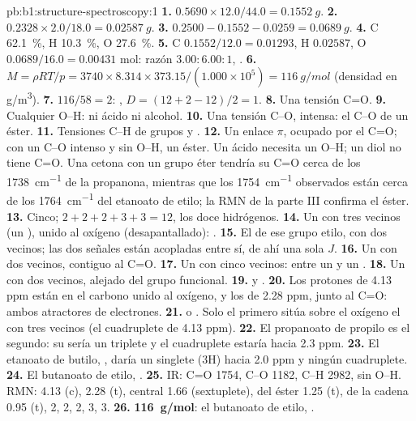 \begin{solution}{pb:b1:structure-spectroscopy:1}
\textbf{1.} $0.5690 \times 12.0/44.0 = \qty{0.1552}{g}$.
\textbf{2.} $0.2328 \times 2.0/18.0 = \qty{0.02587}{g}$.
\textbf{3.} $0.2500 - 0.1552 - 0.0259 = \qty{0.0689}{g}$.
\textbf{4.} C \qty{62.1}{\percent}, H \qty{10.3}{\percent}, O
\qty{27.6}{\percent}.
\textbf{5.} C $0.1552/12.0 = 0.01293$, H $0.02587$, O $0.0689/16.0 =
0.00431$ mol: razón $3.00 : 6.00 : 1$, .
\textbf{6.} $M = \rho RT/p = 3740 \times 8.314 \times 373.15/(1.000 \times 10^5) =
\qty{116}{g/mol}$ (densidad en \unit{g/m^3}).
\textbf{7.} $116/58 = 2$: , $D = (12 + 2 - 12)/2 = 1$.
\textbf{8.} Una tensión C=O.
\textbf{9.} Cualquier O--H: ni ácido ni alcohol.
\textbf{10.} Una tensión C--O, intensa: el C--O de un éster.
\textbf{11.} Tensiones C--H de grupos  y .
\textbf{12.} Un enlace $\pi$, ocupado por el C=O; con un C--O intenso y
sin O--H, un éster. Un ácido necesita un O--H; un diol no tiene C=O. Una
cetona con un grupo éter tendría su C=O cerca de los \qty{1738}{cm^{-1}}
de la propanona, mientras que los \qty{1754}{cm^{-1}} observados están
cerca de los \qty{1764}{cm^{-1}} del etanoato de etilo; la RMN de la parte
III confirma el éster.
\textbf{13.} Cinco; $2 + 2 + 2 + 3 + 3 = 12$, los doce hidrógenos.
\textbf{14.} Un  con tres vecinos (un ), unido al oxígeno
(desapantallado): .
\textbf{15.} El  de ese grupo etilo, con dos vecinos; las dos
señales están acopladas entre sí, de ahí una sola $J$.
\textbf{16.} Un  con dos vecinos, contiguo al C=O.
\textbf{17.} Un  con cinco vecinos: entre un  y un
.
\textbf{18.} Un  con dos vecinos, alejado del grupo funcional.
\textbf{19.}  y .
\textbf{20.} Los protones de 4.13 ppm están en el carbono unido al
oxígeno, y los de 2.28 ppm, junto al C=O: ambos atractores de electrones.
\textbf{21.}  o . Solo
el primero sitúa sobre el oxígeno el  con tres vecinos (el
cuadruplete de 4.13 ppm).
\textbf{22.} El propanoato de propilo es el segundo: su  sería un
triplete y el cuadruplete estaría hacia 2.3 ppm.
\textbf{23.} El etanoato de butilo, , daría un singlete
(3H) hacia 2.0 ppm y ningún cuadruplete.
\textbf{24.} El butanoato de etilo, .
\textbf{25.} IR: C=O 1754, C--O 1182, C--H 2982, sin O--H. RMN: 
4.13 (c),  2.28 (t),  central 1.66 (sextuplete),
 del éster 1.25 (t),  de la cadena 0.95 (t),
 2, 2, 2, 3, 3.
\textbf{26.} \textbf{\qty{116}{g/mol}}: el butanoato de etilo,
.
\end{solution}
